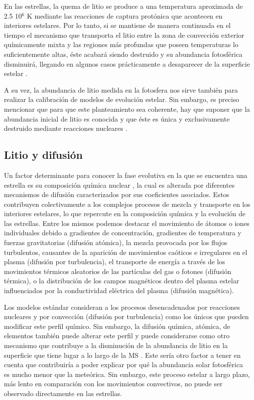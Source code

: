 En las estrellas, la quema de litio se produce a una temperatura aproximada de 2.5 10$^{6}$ K mediante las reacciones de captura protónica que acontecen en interiores estelares. Por lo tanto, si se mantiene de manera continuada en el tiempo el mecanismo que transporta el litio entre la zona de convección exterior químicamente mixta y las regiones más profundas que poseen temperaturas lo suficientemente altas, éste acabará siendo destruido y su abundancia fotosférica disminuirá, llegando en algunos casos prácticamente a desaparecer de la superficie estelar \citep{DelgadoMena2014}.\par

A su vez, la abundancia de litio medida en la fotosfera nos sirve también para realizar la calibración de modelos de evolución estelar. Sin embargo, es preciso mencionar que para que este planteamiento sea coherente, hay que suponer que la abundancia inicial de litio es conocida y que éste es única y exclusivamente destruido mediante reacciones nucleares \citep{Jeffries2004, Asplund2009}.\par

\subsection{Litio y difusión}
Un factor determinante para conocer la fase evolutiva en la que se encuentra una estrella es su composición química nuclear \citep{Pols2011}, la cual es alterada por diferentes mecanismos de difusión caracterizados por sus coeficientes asociados. Estos contribuyen colectivamente a los complejos procesos de mezcla y transporte en los interiores estelares, lo que repercute en la composición química y la evolución de las estrellas. Entre los mismos podemos destacar el movimiento de átomos o iones individuales debido a gradientes de concentración, gradientes de temperatura y fuerzas gravitatorias (difusión atómica), la mezcla provocada por los flujos turbulentos, causantes de la aparición de movimientos caóticos e irregulares en el plasma (difusión por turbulencia), el transporte de energía a través de los movimientos térmicos aleatorios de las partículas del gas o fotones (difusión térmica), o la distribución de los campos magnéticos dentro del plasma estelar influenciados por la conductividad eléctrica del plasma (difusión magnética).\par

Los modelos estándar consideran a los procesos desencadenados por reacciones nucleares y por convección (difusión por turbulencia) como los únicos que pueden modificar este perfil químico. Sin embargo, la difusión química, atómica, de elementos también puede alterar este perfil y puede considerarse como otro mecanismo que contribuye a la disminución de la abundancia de litio en la superficie que tiene lugar a lo largo de la MS \citep{Richard2004, Gruyters2016}. Este sería otro factor a tener en cuenta que contribuiría a poder explicar por qué la abundancia solar fotosférica es mucho menor que la meteórica. Sin embargo, este proceso estelar a largo plazo, más lento en comparación con los movimientos convectivos, no puede ser observado directamente en las estrellas.\par


